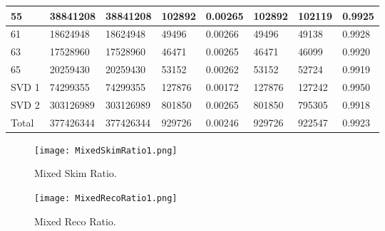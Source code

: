 \documentclass[11pt]{article}
\begin{document}
\begin{tabular}{ | l || l | l | l | l || l | l | l |}
  55&38841208&38841208&102892&0.00265&102892&102119&0.9925\\\hline
  61&18624948&18624948&49496&0.00266&49496&49138&0.9928\\\hline
  63&17528960&17528960&46471&0.00265&46471&46099&0.9920\\\hline
  65&20259430&20259430&53152&0.00262&53152&52724&0.9919\\\hline
  \hline
  SVD 1&74299355&74299355&127876&0.00172&127876&127242&0.9950\\\hline
  SVD 2&303126989&303126989&801850&0.00265&801850&795305&0.9918\\\hline
  Total&377426344&377426344&929726&0.00246&929726&922547&0.9923\\\hline
\end{tabular}


\begin{figure}[!tbh]
  \centering
  \begin{minipage}[b]{0.4\textwidth}
    \texttt{[image: MixedSkimRatio1.png]}
    \caption{Mixed Skim Ratio.}
  \end{minipage}
  \hfill
  \begin{minipage}[b]{0.4\textwidth}
    \texttt{[image: MixedRecoRatio1.png]}
    \caption{Mixed Reco Ratio.}
  \end{minipage}
\end{figure}
\end{document}
